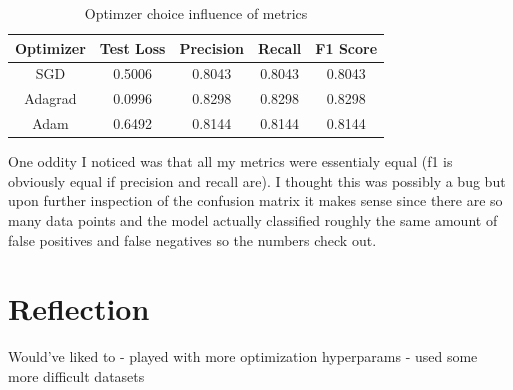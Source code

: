 \documentclass[12pt, twoside]{report}
\begin{document}
\begin{table}[h]
    \centering
    \begin{tabular}{|c|c|c|c|c|}
    \hline
    Optimizer & Test Loss & Precision & Recall & F1 Score \\
    \hline
    SGD & 0.5006 & 0.8043 & 0.8043 & 0.8043 \\
    \hline
    Adagrad & 0.0996 & 0.8298 & 0.8298 & 0.8298 \\
    \hline
    Adam & 0.6492 & 0.8144 & 0.8144 & 0.8144 \\
    \hline
    \end{tabular}
    \caption{Optimzer choice influence of metrics}
\end{table}

One oddity I noticed was that all my metrics were essentialy equal (f1 is obviously equal if precision and
recall are). I thought this was possibly a bug but upon further inspection of the confusion matrix it 
makes sense since there are so many data points and the model actually classified roughly the same
amount of false positives and false negatives so the numbers check out.

\chapter{Reflection}
Would've liked to
- played with more optimization hyperparams
- used some more difficult datasets



\end{document}
